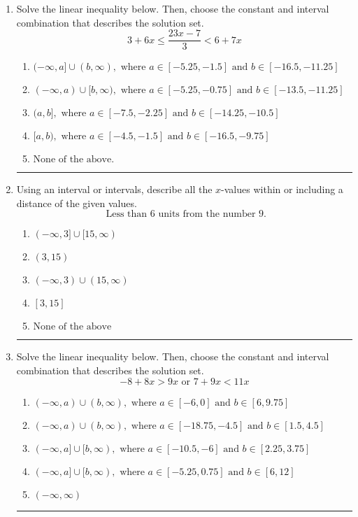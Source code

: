 \documentclass[14pt]{extbook}
\newcommand{\litem}[1]{\item#1\hspace*{-1cm}\rule{\textwidth}{0.4pt}}
\begin{document}
\begin{enumerate}
{\begin{enumerate}[label=\Alph*.]
\end{enumerate} }
\litem{
Solve the linear inequality below. Then, choose the constant and interval combination that describes the solution set.\[ 3 + 6 x \leq \frac{23 x - 7}{3} < 6 + 7 x \]\begin{enumerate}[label=\Alph*.]
\item \( (-\infty, a] \cup (b, \infty), \text{ where } a \in [-5.25, -1.5] \text{ and } b \in [-16.5, -11.25] \)
\item \( (-\infty, a) \cup [b, \infty), \text{ where } a \in [-5.25, -0.75] \text{ and } b \in [-13.5, -11.25] \)
\item \( (a, b], \text{ where } a \in [-7.5, -2.25] \text{ and } b \in [-14.25, -10.5] \)
\item \( [a, b), \text{ where } a \in [-4.5, -1.5] \text{ and } b \in [-16.5, -9.75] \)
\item \( \text{None of the above.} \)

\end{enumerate} }
\litem{
Using an interval or intervals, describe all the $x$-values within or including a distance of the given values.\[ \text{ Less than } 6 \text{ units from the number } 9. \]\begin{enumerate}[label=\Alph*.]
\item \( (-\infty, 3] \cup [15, \infty) \)
\item \( (3, 15) \)
\item \( (-\infty, 3) \cup (15, \infty) \)
\item \( [3, 15] \)
\item \( \text{None of the above} \)

\end{enumerate} }
\litem{
Solve the linear inequality below. Then, choose the constant and interval combination that describes the solution set.\[ -8 + 8 x > 9 x \text{ or } 7 + 9 x < 11 x \]\begin{enumerate}[label=\Alph*.]
\item \( (-\infty, a) \cup (b, \infty), \text{ where } a \in [-6, 0] \text{ and } b \in [6, 9.75] \)
\item \( (-\infty, a) \cup (b, \infty), \text{ where } a \in [-18.75, -4.5] \text{ and } b \in [1.5, 4.5] \)
\item \( (-\infty, a] \cup [b, \infty), \text{ where } a \in [-10.5, -6] \text{ and } b \in [2.25, 3.75] \)
\item \( (-\infty, a] \cup [b, \infty), \text{ where } a \in [-5.25, 0.75] \text{ and } b \in [6, 12] \)
\item \( (-\infty, \infty) \)


\end{enumerate}}
\end{enumerate}
\end{document}
